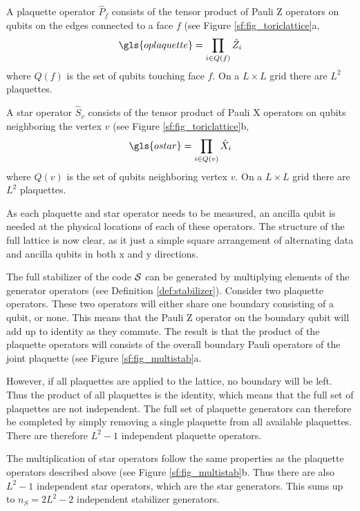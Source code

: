 \begin{definition}
  A plaquette operator $\hat{P}_f$ consists of the tensor product of Pauli Z operators on qubits on the edges connected to a face $f$ (see Figure \ref{sf:fig_toriclattice}a,
  \begin{equation}\label{eq:sf_plaquette}
    \gls{oplaquette} = \prod_{i\in Q(f)} \hat{Z}_i
  \end{equation}
  where $Q(f)$ is the set of qubits touching face $f$. On a $L\times L$ grid there are $L^2$ plaquettes.
\end{definition}

\begin{definition}
  A star operator $\hat{S}_v$ consists of the tensor product of Pauli X operators on qubits neighboring the vertex $v$ (see Figure \ref{sf:fig_toriclattice}b,
  \begin{equation}\label{eq:sf_star}
    \gls{ostar} = \prod_{i\in Q(v)} \hat{X}_i
  \end{equation}
  where $Q(v)$ is the set of qubits neighboring vertex $v$. On a $L\times L$ grid there are $L^2$ plaquettes.
\end{definition}

As each plaquette and star operator needs to be measured, an ancilla qubit is needed at the physical locations of each of these operators. The structure of the full lattice is now clear, as it just a simple square arrangement of alternating data and ancilla qubits in both x and y directions.

The full stabilizer of the code $\mathcal{S}$ can be generated by multiplying elements of the generator operators (see Definition \ref{def:stabilizer}). Consider two plaquette operators. These two operators will either share one boundary consisting of a qubit, or none. This means that the Pauli Z operator on the boundary qubit will add up to identity as they commute. The result is that the product of the plaquette operators will consists of the overall boundary Pauli operators of the joint plaquette (see Figure \ref{sf:fig_multistab}a.

However, if all plaquettes are applied to the lattice, no boundary will be left. Thus the product of all plaquettes is the identity, which means that the full set of plaquettes are not independent. The full set of plaquette generators can therefore be completed by simply removing a single plaquette from all available plaquettes. There are therefore $L^2 - 1$ independent plaquette operators.

The multiplication of star operators follow the same properties as the plaquette operators described above (see Figure \ref{sf:fig_multistab}b. Thus there are also $L^2 - 1$ independent star operators, which are the star generators. This sums up to $n_S = 2L^2 - 2$ independent stabilizer generators.


